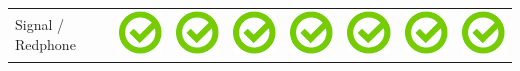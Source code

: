 \documentclass[10pt,foldmark,tumble]{leaflet}
\begin{document}
{\begin{tabular}{ L{2cm} | C{2cm} | C{2cm} | C{2cm} | C{2cm} | C{2cm} | C{2cm} | C{2cm} | }
Signal / Redphone & \includegraphics[scale=0.1]{pics/haken.png} & \includegraphics[scale=0.1]{pics/haken.png} & \includegraphics[scale=0.1]{pics/haken.png} & \includegraphics[scale=0.1]{pics/haken.png} & \includegraphics[scale=0.1]{pics/haken.png} & \includegraphics[scale=0.1]{pics/haken.png} & \includegraphics[scale=0.1]{pics/haken.png} \tabularnewline

\end{tabular}}
\end{document}
